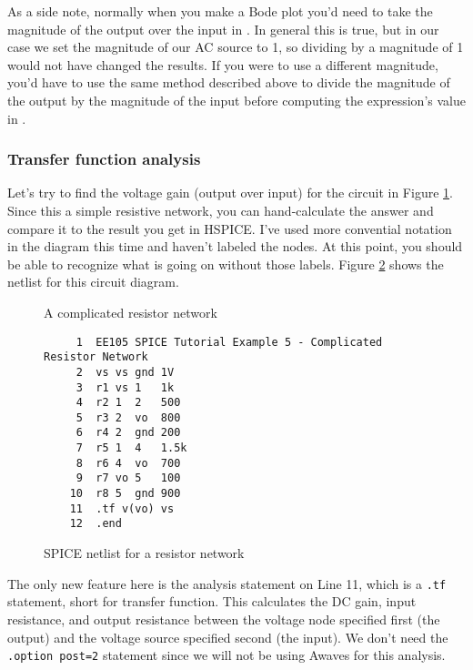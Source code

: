 \documentclass{article}
\begin{document}
As a side note, normally when you make a Bode plot you'd need to take the magnitude of the output over the input in \deci\bel. In general this is true, but in our case we set the magnitude of our AC source to \unit{1}{\volt}, so dividing by a magnitude of \unit{1}{\volt} would not have changed the results. If you were to use a different magnitude, you'd have to use the same method described above to divide the magnitude of the output by the magnitude of the input before computing the expression's value in \deci\bel.

\subsubsection{Transfer function analysis}

Let's try to find the voltage gain (output over input) for the circuit in Figure \ref{tfdiagram}. Since this a simple resistive network, you can hand-calculate the answer and compare it to the result you get in HSPICE. I've used more convential notation in the diagram this time and haven't labeled the nodes. At this point, you should be able to recognize what is going on without those labels. Figure \ref{tfnetlist} shows the netlist for this circuit diagram.

\begin{figure}[!htb]
  
  \centerline{\box\graph}
  \caption{A complicated resistor network}
  \label{tfdiagram}
\end{figure}

\begin{figure}[!htb]
  \begin{verbatim}
     1  EE105 SPICE Tutorial Example 5 - Complicated Resistor Network
     2  vs vs gnd 1V
     3  r1 vs 1   1k
     4  r2 1  2   500
     5  r3 2  vo  800 
     6  r4 2  gnd 200
     7  r5 1  4   1.5k
     8  r6 4  vo  700
     9  r7 vo 5   100
    10  r8 5  gnd 900
    11  .tf v(vo) vs
    12  .end \end{verbatim}
  \caption{SPICE netlist for a resistor network}
  \label{tfnetlist}
\end{figure}

The only new feature here is the analysis statement on Line 11, which is a \verb|.tf| statement, short for transfer function. This calculates the DC gain, input resistance, and output resistance between the voltage node specified first (the output) and the voltage source specified second (the input). We don't need the \verb|.option post=2| statement since we will not be using Awaves for this analysis.
\end{document}
